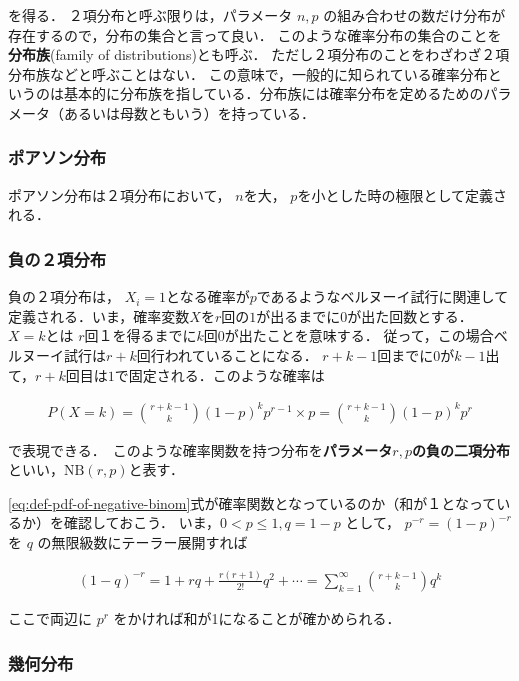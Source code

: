 \documentclass[12pt,a4j,draft]{jarticle}
\numberwithin{equation}{section}
\theoremstyle{break}
\begin{document}
を得る． ２項分布と呼ぶ限りは，パラメータ $n,p$ の組み合わせの数だけ分布が存在するので，分布の集合と言って良い． このような確率分布の集合のことを\textbf{分布族}(family of distributions)とも呼ぶ． ただし２項分布のことをわざわざ２項分布族などと呼ぶことはない．
この意味で，一般的に知られている確率分布というのは基本的に分布族を指している．分布族には確率分布を定めるためのパラメータ（あるいは母数ともいう）を持っている．

\subsubsection{ポアソン分布}

ポアソン分布は２項分布において， $n$を大， $p$を小とした時の極限として定義される．

\subsubsection{負の２項分布}

負の２項分布は， $X_i=1$となる確率が$p$であるようなベルヌーイ試行に関連して定義される．いま，確率変数$X$を$r$回の$1$が出るまでに$0$が出た回数とする． $X=k$とは $r$回１を得るまでに$k$回0が出たことを意味する． 従って，この場合ベルヌーイ試行は$r+k$回行われていることになる． $r+k-1$回までに0が$k-1$出て，$r+k$回目は$1$で固定される．このような確率は

\begin{align}
    \label{eq:def-pdf-of-negative-binom}
    P(X=k) = \binom{r+k-1}{k}(1-p)^k p^{r-1} \times p = \binom{r+k-1}{k}(1-p)^{k} p^r
\end{align}

で表現できる．　このような確率関数を持つ分布を\textbf{パラメータ$r,p$の負の二項分布}といい，$\text{NB}(r,p)$と表す．

\eqref{eq:def-pdf-of-negative-binom}式が確率関数となっているのか（和が１となっているか）を確認しておこう．
いま，$0 < p \leq 1, q = 1-p$ として， $p^{-r} = (1 - p)^{-r}$ を $q$ の無限級数にテーラー展開すれば

\begin{align}
    (1 - q)^{-r} = 1 + rq + \frac{r(r+1)}{2!} q^2 + \cdots = \sum_{k=1}^{\infty} \binom{r+k-1}{k} q^k
\end{align}

ここで両辺に $p^r$ をかければ和が1になることが確かめられる．

\subsubsection{幾何分布}
\end{document}
